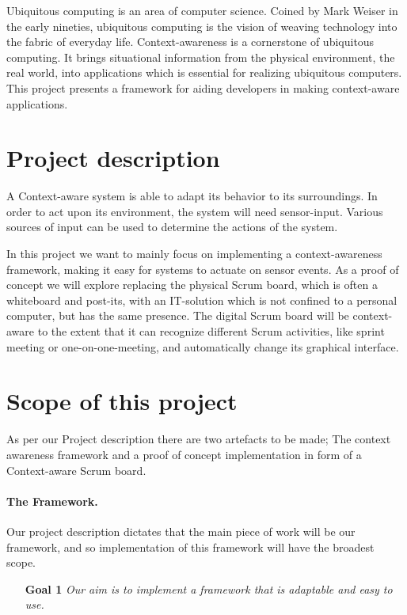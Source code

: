 \documentclass[../report.tex]{subfiles}
\begin{document}
\graphicspath{{img/}{../img/}}
Ubiquitous computing is an area of computer science. Coined by Mark Weiser in the early nineties, ubiquitous computing is the vision of weaving technology into the fabric of everyday life. Context-awareness is a cornerstone of ubiquitous computing. It brings situational information from the physical environment, the real world, into applications which is essential for realizing ubiquitous computers. This project presents a framework for aiding developers in making context-aware applications.

\section{Project description}
A Context-aware system is able to adapt its behavior to its surroundings. In order to act upon its environment, the system will need sensor-input. Various sources of input can be used to determine the actions of the system.

In this project we want to mainly focus on implementing a context-awareness framework, making it easy for systems to actuate on sensor events. As a proof of concept we will explore replacing the physical Scrum board, which is often a whiteboard and post-its, with an IT-solution which is not confined to a personal computer, but has the same presence. The digital Scrum board will be context-aware to the extent that it can recognize different Scrum activities, like sprint meeting or one-on-one-meeting, and automatically change its graphical interface.


\section{Scope of this project}
\label{scrope}

As per our Project description there are two artefacts to be made; The context awareness framework and a proof of concept implementation in form of a Context-aware Scrum board.

\paragraph{The Framework.} 
Our project description dictates that the main piece of work will be our framework, and so implementation of this framework will have the broadest scope.\\

\begin{itemize}
\item[\textbf{Goal 1}] \textit{Our aim is to implement a framework that is adaptable and easy to use.}
\end{itemize}
\end{document}
